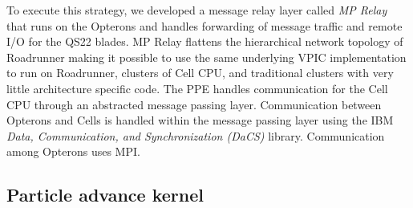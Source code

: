 \documentclass[journal,twoside]{IEEEtran}
\begin{document}

To execute this strategy, we developed a message relay layer called
\emph{MP Relay} that runs on the Opterons and handles forwarding of
message traffic and remote I/O for the QS22 blades.
MP Relay flattens the hierarchical network topology of Roadrunner
making it possible to use the same underlying VPIC implementation to
run on Roadrunner, clusters of Cell CPU, and traditional clusters with
very little architecture specific code.  The PPE handles communication
for the Cell CPU through an abstracted message passing layer.
Communication between Opterons and Cells is handled within the message
passing layer using the IBM \emph{Data, Communication, and
Synchronization (DaCS)} library.  Communication among Opterons uses
MPI.



\subsection{Particle advance kernel}
\end{document}
